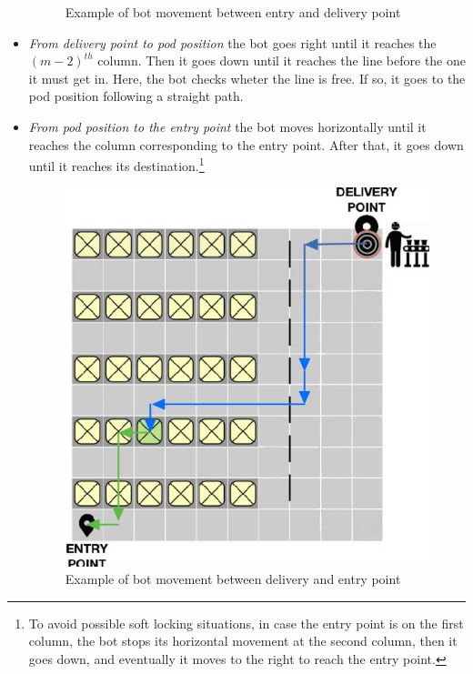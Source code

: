 \documentclass[10pt,a4paper]{article}
\begin{document}
\begin{itemize}
\begin{figure}[ht]
						\caption{Example of bot movement between entry and delivery point}
					\end{figure}
					\item \emph{From delivery point to pod position} the bot goes right until it reaches the ${(m-2)}^{th}$ column. Then it goes down until it reaches the line before the one it must get in. Here, the bot checks wheter the line is free. If so, it goes to the pod position following a straight path.
					\item \emph{From pod position to the entry point} the bot moves horizontally until it reaches the column corresponding to the entry point. After that, it goes down until it reaches its destination.\footnote{To avoid possible soft locking situations, in case the entry point is on the first column, the bot stops its horizontal movement at the second column, then it goes down, and eventually it moves to the right to reach the entry point.}
					\begin{figure}[ht]
						\centering
						\includegraphics[scale = 0.36]{Images/BotMovement2.JPG}
						\caption{Example of bot movement between delivery and entry point}
					\end{figure}
				\end{itemize}
\end{document}
